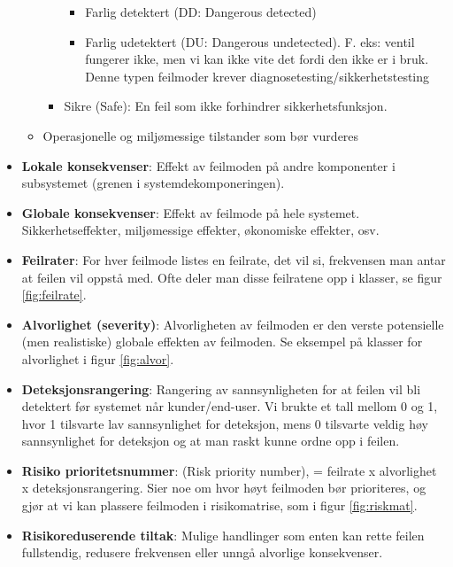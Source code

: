 \begin{itemize}
\begin{itemize}
\begin{itemize}
            \begin{itemize}
                \item Farlig detektert (DD: Dangerous detected)
                \item Farlig udetektert (DU: Dangerous undetected). F. eks: ventil fungerer ikke, men vi kan ikke vite det fordi den ikke er i bruk. Denne typen feilmoder krever diagnosetesting/sikkerhetstesting
            \end{itemize}
            \item Sikre (Safe): En feil som ikke forhindrer sikkerhetsfunksjon.
        \end{itemize}
        \item Operasjonelle og miljømessige tilstander som bør vurderes
    \end{itemize}
    \item \textbf{Lokale konsekvenser}: Effekt av feilmoden på andre komponenter i subsystemet (grenen i systemdekomponeringen).
    \item \textbf{Globale konsekvenser}: Effekt av feilmode på hele systemet. Sikkerhetseffekter, miljømessige effekter, økonomiske effekter, osv.
    \item \textbf{Feilrater}: For hver feilmode listes en feilrate, det vil si, frekvensen man antar at feilen vil oppstå med. Ofte deler man disse feilratene opp i klasser, se figur \ref{fig:feilrate}.
    \item \textbf{Alvorlighet (severity)}: Alvorligheten av feilmoden er den verste potensielle (men realistiske) globale effekten av feilmoden. Se eksempel på klasser for alvorlighet i figur \ref{fig:alvor}.
    \item \textbf{Deteksjonsrangering}: Rangering av sannsynligheten for at feilen vil bli detektert før systemet når kunder/end-user. Vi brukte et tall mellom 0 og 1, hvor 1 tilsvarte lav sannsynlighet for deteksjon, mens 0 tilsvarte veldig høy sannsynlighet for deteksjon og at man raskt kunne ordne opp i feilen. 
    \item \textbf{Risiko prioritetsnummer}: (Risk priority number), = feilrate x alvorlighet x deteksjonsrangering.
    Sier noe om hvor høyt feilmoden bør prioriteres, og gjør at vi kan plassere feilmoden i risikomatrise, som i figur \ref{fig:riskmat}.
    \item \textbf{Risikoreduserende tiltak}: Mulige handlinger som enten kan rette feilen fullstendig, redusere frekvensen eller unngå alvorlige konsekvenser.
\end{itemize}


